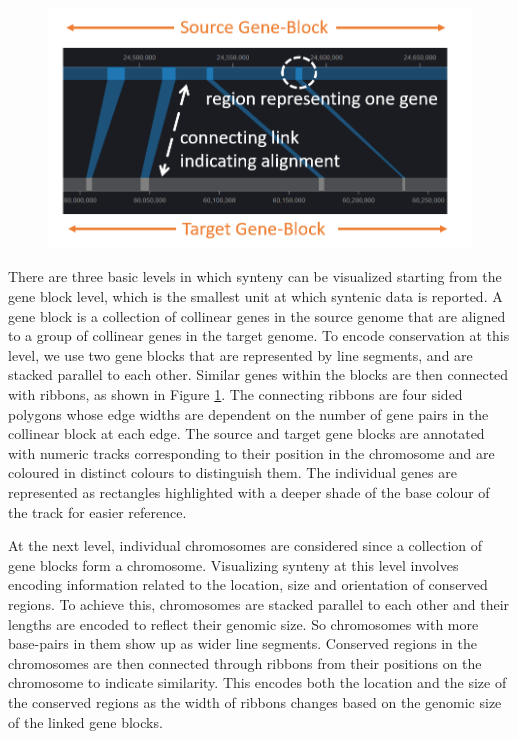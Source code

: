 \begin{figure}
  \centering
  \includegraphics[width=.50\linewidth]{images/ch_4_link_plot.PNG}
  \label{fig:ch_4_link_plot}
\end{figure}


There are three basic levels in which synteny can be visualized starting from the gene block level, which is the smallest unit at which syntenic data is reported. A gene block is a collection of collinear genes in the source genome that are aligned to a group of collinear genes in the target genome. To encode conservation at this level, we use two gene blocks that are represented by line segments, and are stacked parallel to each other. Similar genes within the blocks are then connected with ribbons, as shown in Figure \ref{fig:ch_4_link_plot}. The connecting ribbons are four sided polygons whose edge widths are dependent on the number of gene pairs in the collinear block at each edge. The source and target gene blocks are annotated with numeric tracks corresponding to their position in the chromosome and are coloured in distinct colours to distinguish them. The individual genes are represented as rectangles highlighted with a deeper shade of the base colour of the track for easier reference. 

At the next level, individual chromosomes are considered since a collection of gene blocks form a chromosome. Visualizing synteny at this level involves encoding information related to the location, size and orientation of conserved regions. To achieve this, chromosomes are stacked parallel to each other and their lengths are encoded to reflect their genomic size. So chromosomes with more base-pairs in them show up as wider line segments. Conserved regions in the chromosomes are then connected through ribbons from their positions on the chromosome to indicate similarity. This encodes both the location and the size of the conserved regions as the width of ribbons changes based on the genomic size of the linked gene blocks.


